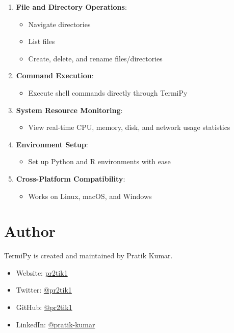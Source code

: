 \documentclass[
  letterpaper,
  DIV=11,
  numbers=noendperiod]{scrreprt}
\providecommand{\tightlist}{%
  \setlength{\itemsep}{0pt}\setlength{\parskip}{0pt}}\usepackage{longtable,booktabs,array}
\begin{document}
\begin{enumerate}
\def\labelenumi{\arabic{enumi}.}
\tightlist
\item
  \textbf{File and Directory Operations}:

  \begin{itemize}
  \tightlist
  \item
    Navigate directories
  \item
    List files
  \item
    Create, delete, and rename files/directories
  \end{itemize}
\item
  \textbf{Command Execution}:

  \begin{itemize}
  \tightlist
  \item
    Execute shell commands directly through TermiPy
  \end{itemize}
\item
  \textbf{System Resource Monitoring}:

  \begin{itemize}
  \tightlist
  \item
    View real-time CPU, memory, disk, and network usage statistics
  \end{itemize}
\item
  \textbf{Environment Setup}:

  \begin{itemize}
  \tightlist
  \item
    Set up Python and R environments with ease
  \end{itemize}
\item
  \textbf{Cross-Platform Compatibility}:

  \begin{itemize}
  \tightlist
  \item
    Works on Linux, macOS, and Windows
  \end{itemize}
\end{enumerate}

\section*{Author}\label{author}


TermiPy is created and maintained by Pratik Kumar.

\begin{itemize}
\tightlist
\item
  Website: \href{https://pr2tik1.github.io/}{pr2tik1}
\item
  Twitter: \href{https://twitter.com/pr2tik1}{@pr2tik1}
\item
  GitHub: \href{https://github.com/pr2tik1}{@pr2tik1}
\item
  LinkedIn:
  \href{https://www.linkedin.com/in/pratik-kumar/}{@pratik-kumar}
\end{itemize}
\end{document}
